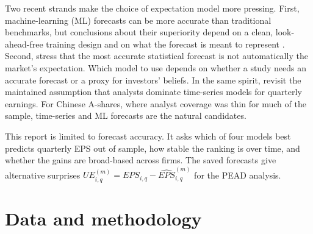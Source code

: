 \documentclass[11pt]{article}
\begin{document}
Two recent strands make the choice of expectation model more pressing. First, machine-learning (ML) forecasts can be
more accurate than traditional benchmarks, but conclusions about their superiority depend on a clean, look-ahead-free
training design and on what the forecast is meant to represent \citep{zhang2025}. Second, \citet{campbell2026} stress
that the most accurate statistical forecast is not automatically the market's expectation. Which model to use depends
on whether a study needs an accurate forecast or a proxy for investors' beliefs. In the same spirit,
\citet{pagach2020} revisit the maintained assumption that analysts dominate time-series models for quarterly earnings.
For Chinese A-shares, where analyst coverage was thin for much of the sample, time-series and ML forecasts are the
natural candidates.

This report is limited to forecast accuracy. It asks which of four models best predicts quarterly EPS out of
sample, how stable the ranking is over time, and whether the gains are broad-based across firms. The saved forecasts
give alternative surprises $UE^{(m)}_{i,q}=EPS_{i,q}-\widehat{EPS}^{(m)}_{i,q}$ for the PEAD analysis.

\section{Data and methodology}
\end{document}
